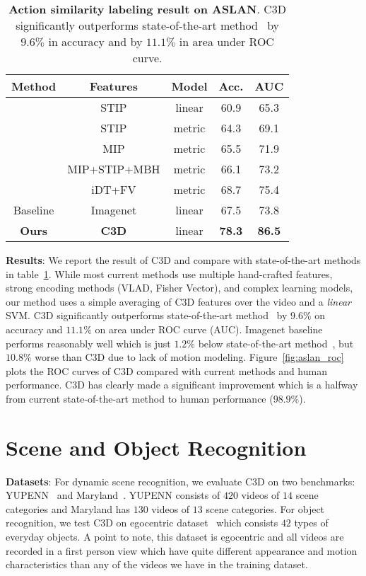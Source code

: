 \documentclass[10pt,twocolumn,letterpaper]{article}
\begin{document}
\begin{table}
\begin{center}
\begin{tabular}{|c|c|c|c|c|}
\hline
Method & Features & Model & Acc. & AUC \\
\hline
\cite{aslanPAMI12} & STIP & linear & 60.9 & 65.3 \\
\cite{aslanWS11} & STIP & metric & 64.3 & 69.1 \\
\cite{aslanECCV12} & MIP & metric & 65.5 & 71.9 \\
\cite{aslanCVPRW13} & MIP+STIP+MBH & metric & 66.1 & 73.2 \\
\cite{XPengSPL14} & iDT+FV & metric & 68.7 & 75.4 \\
Baseline & Imagenet & linear & 67.5 & 73.8 \\
{\bf Ours} & {\bf C3D} & linear & {\bf 78.3} & {\bf 86.5} \\ 
\hline
\end{tabular}
\end{center}
\vspace{-8pt}
\caption{{\bf Action similarity labeling result on ASLAN}. C3D significantly outperforms state-of-the-art method~\cite{XPengSPL14} by $9.6\%$ in accuracy and by $11.1\%$ in area under ROC curve.}
\label{tab:aslan_results}
\vspace{-16pt}
\end{table}

{\bf Results}: We report the result of C3D and compare with state-of-the-art methods in table~\ref{tab:aslan_results}. While most current methods use multiple hand-crafted features, strong encoding methods (VLAD, Fisher Vector), and complex learning models, our method uses a simple averaging of C3D features over the video and a \emph{linear} SVM. C3D significantly outperforms state-of-the-art method~\cite{XPengSPL14} by $9.6\%$ on accuracy and $11.1\%$ on area under ROC curve (AUC). Imagenet baseline performs reasonably well which is just $1.2\%$ below state-of-the-art method~\cite{XPengSPL14}, but $10.8\%$ worse than C3D due to lack of motion modeling. Figure~\ref{fig:aslan_roc} plots the ROC curves of C3D compared with current methods and human performance. C3D has clearly made a significant improvement which is a halfway from current state-of-the-art method to human performance ($98.9\%$). 
\section{Scene and Object Recognition}
\label{sec:dynamic_scene}
\vspace{-6pt}
{\bf Datasets}: For dynamic scene recognition, we evaluate C3D on two benchmarks:  YUPENN~\cite{Derpanis12} and Maryland~\cite{umd_scene}. YUPENN consists of $420$ videos of $14$ scene categories and Maryland has $130$ videos of $13$ scene categories. For object recognition, we test C3D on egocentric dataset~\cite{Ren2009} which consists $42$ types of everyday objects. A point to note, this dataset is egocentric and all videos are recorded in a first person view which have quite different appearance and motion characteristics than any of the videos we have in the training dataset.
\end{document}
